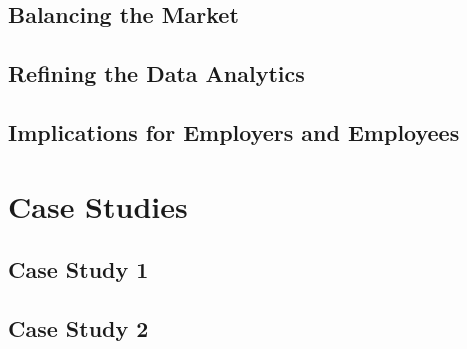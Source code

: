 \documentclass[twoside, 12pt, a4paper]{article}
\begin{document}
\subsection{Balancing the Market}

\newpage
\subsection{Refining the Data Analytics}




\subsection{Implications for Employers and Employees}

\newpage
\section{Case Studies}
\subsection{Case Study 1}
\subsection{Case Study 2}
\end{document}
